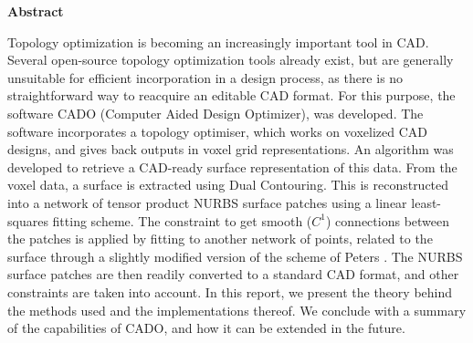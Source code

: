 

\clearemptydoublepage
{}
{}	





\vspace*{2cm}
\begin{center}
{\Large \bf Abstract}
\end{center}
\vspace{1cm}

Topology optimization is becoming an increasingly important tool in CAD. Several open-source topology optimization tools already exist, but are generally unsuitable for efficient incorporation in a design process, as there is no straightforward way to reacquire an editable CAD format. For this purpose, the software CADO (Computer Aided Design Optimizer), was developed. The software incorporates a topology optimiser, which works on voxelized CAD designs, and gives back outputs in voxel grid representations. An algorithm was developed to retrieve a CAD-ready surface representation of this data. From the voxel data, a surface is extracted using Dual Contouring. This is reconstructed into a network of tensor product NURBS surface patches using a linear least-squares fitting scheme. The constraint to get smooth ($C^1$) connections between the patches is applied by fitting to another network of points, related to the surface through a slightly modified version of the scheme of Peters \cite{peters1992constructing}. The NURBS surface patches are then readily converted to a standard CAD format, and other constraints are taken into account. In this report, we present the theory behind the methods used and the implementations thereof. We conclude with a summary of the capabilities of CADO, and how it can be extended in the future.
%
%
